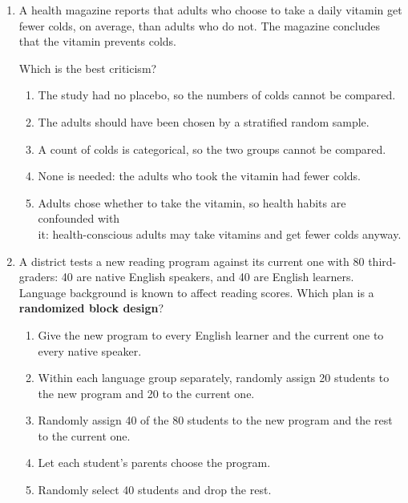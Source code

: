 \documentclass[12pt]{article}
\begin{document}
\begin{enumerate}[leftmargin=1.9em, itemsep=0.13in]
  \boxguard[14]
  \item A health magazine reports that adults who choose to take a daily vitamin get fewer
        colds, on average, than adults who do not. The magazine concludes that the vitamin
        prevents colds.

        Which is the best criticism?\hfill{}\rule[-0.2in]{0pt}{0.48in}
        \begin{enumerate}[label=\textbf{(\Alph*)}, leftmargin=2.2em, itemsep=2pt]
          \item The study had no placebo, so the numbers of colds cannot be compared.
          \item The adults should have been chosen by a stratified random sample.
          \item A count of colds is categorical, so the two groups cannot be compared.
          \item None is needed: the adults who took the vitamin had fewer colds.
          \item Adults chose whether to take the vitamin, so health habits are confounded with\\
                it: health-conscious adults may take vitamins and get fewer colds anyway.
        \end{enumerate}

  \boxguard[13]
  \item A district tests a new reading program against its current one with 80 third-graders:
        40 are native English speakers, and 40 are English learners. Language background is
        known to affect reading scores. Which plan is a \textbf{randomized block design}?
        \begin{enumerate}[label=\textbf{(\Alph*)}, leftmargin=2.2em, itemsep=2pt]
          \item Give the new program to every English learner and the current one to every
                native speaker.
          \item Within each language group separately, randomly assign 20 students to\\
                the new program and 20 to the current one.
          \item Randomly assign 40 of the 80 students to the new program and the rest to the
                current one.
          \item Let each student's parents choose the program.
          \item Randomly select 40 students and drop the rest.\hfill{}\rule[-0.2in]{0pt}{0.48in}
        \end{enumerate}


\end{enumerate}
\end{document}
